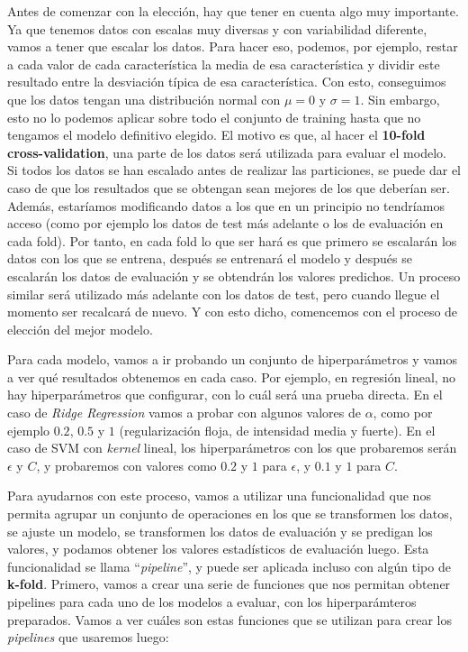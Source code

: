 \documentclass[11pt,a4paper]{article}
\begin{document}
Antes de comenzar con la elección, hay que tener en cuenta algo muy
importante. Ya que tenemos datos con escalas muy diversas y con
variabilidad diferente, vamos a tener que escalar los datos. Para hacer
eso, podemos, por ejemplo, restar a cada valor de cada característica la
media de esa característica y dividir este resultado entre la desviación
típica de esa característica. Con esto, conseguimos que los datos tengan
una distribución normal con \(\mu = 0\) y \(\sigma = 1\). Sin embargo,
esto no lo podemos aplicar sobre todo el conjunto de training hasta que
no tengamos el modelo definitivo elegido. El motivo es que, al hacer el
\textbf{10-fold cross-validation}, una parte de los datos será utilizada
para evaluar el modelo. Si todos los datos se han escalado antes de
realizar las particiones, se puede dar el caso de que los resultados que
se obtengan sean mejores de los que deberían ser. Además, estaríamos
modificando datos a los que en un principio no tendríamos acceso (como
por ejemplo los datos de test más adelante o los de evaluación en cada
fold). Por tanto, en cada fold lo que ser hará es que primero se
escalarán los datos con los que se entrena, después se entrenará el
modelo y después se escalarán los datos de evaluación y se obtendrán los
valores predichos. Un proceso similar será utilizado más adelante con
los datos de test, pero cuando llegue el momento ser recalcará de nuevo.
Y con esto dicho, comencemos con el proceso de elección del mejor
modelo.

Para cada modelo, vamos a ir probando un conjunto de hiperparámetros y
vamos a ver qué resultados obtenemos en cada caso. Por ejemplo, en
regresión lineal, no hay hiperparámetros que configurar, con lo cuál
será una prueba directa. En el caso de \emph{Ridge Regression} vamos a
probar con algunos valores de \(\alpha\), como por ejemplo \(0.2\),
\(0.5\) y \(1\) (regularización floja, de intensidad media y fuerte). En
el caso de SVM con \emph{kernel} lineal, los hiperparámetros con los que
probaremos serán \(\epsilon\) y \(C\), y probaremos con valores como
\(0.2\) y \(1\) para \(\epsilon\), y \(0.1\) y \(1\) para \(C\).

Para ayudarnos con este proceso, vamos a utilizar una funcionalidad que
nos permita agrupar un conjunto de operaciones en los que se transformen
los datos, se ajuste un modelo, se transformen los datos de evaluación y
se predigan los valores, y podamos obtener los valores estadísticos de
evaluación luego. Esta funcionalidad se llama ``\emph{pipeline}'', y puede
ser aplicada incluso con algún tipo de \textbf{k-fold}. Primero, vamos a
crear una serie de funciones que nos permitan obtener pipelines para
cada uno de los modelos a evaluar, con los hiperparámteros preparados.
Vamos a ver cuáles son estas funciones que se utilizan para crear los
\emph{pipelines} que usaremos luego:
\end{document}
